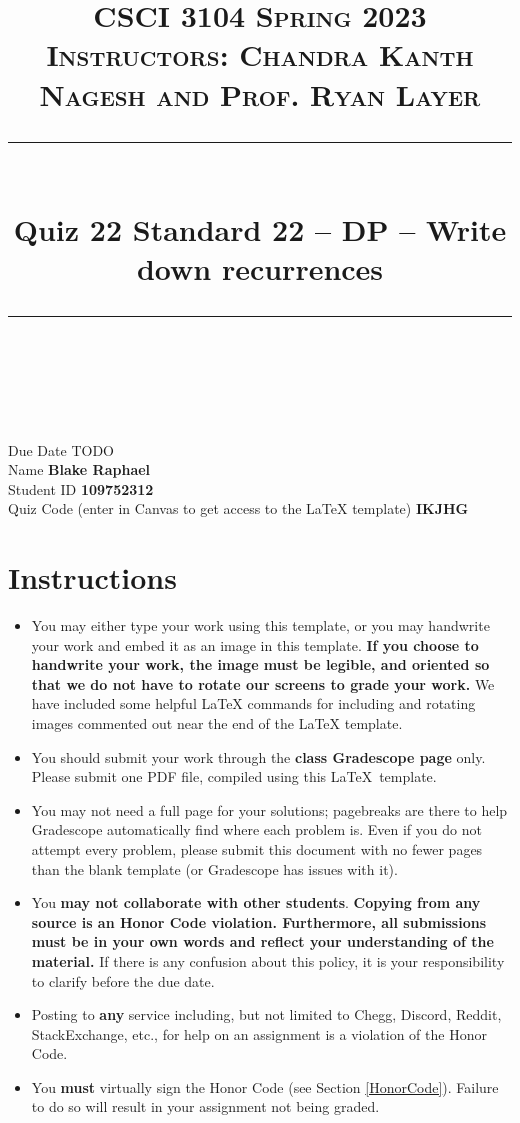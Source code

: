 \documentclass[11pt]{article}
\title{
\normalfont \normalsize 
\textsc{CSCI 3104 Spring 2023 \\ 
Instructors: Chandra Kanth Nagesh and Prof. Ryan Layer} \\
[10pt] 
\rule{\linewidth}{0.5pt} \\[6pt] 
\huge Quiz 22 Standard 22 --  DP -- Write down recurrences \\
\rule{\linewidth}{2pt}  \\[10pt]
}
\date{}
\theoremstyle{definition}
\theoremstyle{definition}
\theoremstyle{definition}
\begin{document}

\maketitle


\noindent
Due Date \dotfill TODO \\
Name \dotfill \textbf{Blake Raphael} \\
Student ID \dotfill \textbf{109752312} \\
Quiz Code (enter in Canvas to get access to the LaTeX template) \dotfill \textbf{IKJHG}


\tableofcontents

\section*{Instructions}
 \begin{itemize}
	\item You may either type your work using this template, or you may handwrite your work and embed it as an image in this template. \textbf{If you choose to handwrite your work, the image must be legible, and oriented so that we do not have to rotate our screens to grade your work.} We have included some helpful LaTeX commands for including and rotating images commented out near the end of the LaTeX template.
	\item You should submit your work through the \textbf{class Gradescope page} only. Please submit one PDF file, compiled using this \LaTeX \ template.
	\item You may not need a full page for your solutions; pagebreaks are there to help Gradescope automatically find where each problem is. Even if you do not attempt every problem, please submit this document with no fewer pages than the blank template (or Gradescope has issues with it).

	\item You \textbf{may not collaborate with other students}. \textbf{Copying from any source is an Honor Code violation. Furthermore, all submissions must be in your own words and reflect your understanding of the material.} If there is any confusion about this policy, it is your responsibility to clarify before the due date. 

	\item Posting to \textbf{any} service including, but not limited to Chegg, Discord, Reddit, StackExchange, etc., for help on an assignment is a violation of the Honor Code.

	\item You \textbf{must} virtually sign the Honor Code (see Section \ref{HonorCode}). Failure to do so will result in your assignment not being graded.
\end{itemize}
\end{document}

